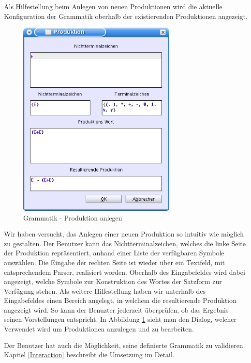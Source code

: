 Als Hilfestellung beim Anlegen von neuen Produktionen wird die aktuelle
Konfiguration der Grammatik oberhalb der existierenden Produktionen
angezeigt.\vspace{10pt}


\begin{figure}[h!]
\begin{center}
\includegraphics[width=8cm]{../images/production_dialog.png}
\caption{Grammatik - Produktion anlegen}
\label{FigureAddProduction}
\end{center}
\end{figure}
\vspace{10pt}

Wir haben versucht, das Anlegen einer neuen Produktion so intuitiv wie möglich
zu gestalten. Der Benutzer kann das Nichtterminalzeichen, welches die linke
Seite der Produktion repräsentiert, anhand einer Liste der
verfügbaren Symbole auswählen. Die Eingabe der rechten Seite ist
wieder über ein Textfeld, mit entsprechendem Parser, realisiert
worden. Oberhalb des Eingabefeldes wird dabei angezeigt, welche Symbole zur
Konstruktion des Wortes der Satzform zur Verfügung stehen. Als weitere
Hilfestellung haben wir unterhalb des Eingabefeldes einen Bereich angelegt,
in welchem die resultierende Produktion angezeigt wird. So kann der
Benuzter jederzeit überprüfen, ob das Ergebnis seinen
Vorstellungen entspricht. In Abbildung \ref{FigureAddProduction}
sieht man den Dialog, welcher Verwendet wird um Produktionen
anzulegen und zu bearbeiten.\vspace{10pt}

Der Benutzer hat auch die Möglichkeit, seine definierte Grammatik zu validieren.
Kapitel \ref{Interaction} beschreibt die Umsetzung im Detail.\vspace{10pt}
